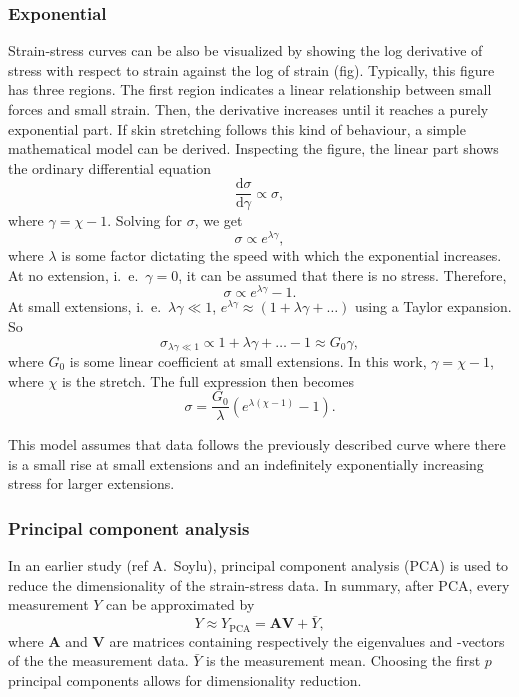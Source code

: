 \subsubsection{Exponential}
Strain-stress curves can be also be visualized by showing the log derivative of stress with respect to strain against the log of strain (fig).
Typically, this figure has three regions.
The first region indicates a linear relationship between small forces and small strain.
Then, the derivative increases until it reaches a purely exponential part.
If skin stretching follows this kind of behaviour, a simple mathematical model can be derived.
Inspecting the figure, the linear part shows the ordinary differential equation
\begin{equation}
    \frac{\mathrm{d}\sigma}{\mathrm{d}\gamma} \propto \sigma,
\end{equation}
where $\gamma = \chi - 1$.
Solving for $\sigma$, we get
\begin{equation}
    \sigma \propto e^{\lambda\gamma},
\end{equation}
where $\lambda$ is some factor dictating the speed with which the exponential increases.
At no extension, i.\ e.\ $\gamma=0$, it can be assumed that there is no stress.
Therefore,
\begin{equation}
    \sigma \propto e^{\lambda\gamma} - 1.
\end{equation}
At small extensions, i.\ e.\ $\lambda\gamma \ll 1$, $e^{\lambda\gamma} \approx (1 + \lambda\gamma + \ldots)$ using a Taylor expansion.
So
\begin{equation}
    \sigma_{\lambda\gamma\ll 1} \propto 1 + \lambda\gamma + \ldots - 1 \approx G_0 \gamma,
\end{equation}
where $G_0$ is some linear coefficient at small extensions.
In this work, $\gamma = \chi - 1$, where $\chi$ is the stretch.
The full expression then becomes
\begin{equation}\label{eq:exp}
    \sigma = \frac{G_0}{\lambda}\left(e^{\lambda(\chi - 1)}-1\right).
\end{equation}

This model assumes that data follows the previously described curve where there is a small rise at small extensions and an indefinitely exponentially increasing stress for larger extensions.

\subsubsection{Principal component analysis}
In an earlier study (ref A.\ Soylu), principal component analysis (PCA) is used to reduce the dimensionality of the strain-stress data.
In summary, after PCA, every measurement $Y$ can be approximated by
\begin{equation}\label{eq:pca}
    Y \approx Y_\mathrm{PCA} = \mathbf{A} \mathbf{V} + \bar{Y},
\end{equation}
where $\mathbf{A}$ and $\mathbf{V}$ are matrices containing respectively the eigenvalues and -vectors of the the measurement data.
$\bar{Y}$ is the measurement mean.
Choosing the first $p$ principal components allows for dimensionality reduction.

